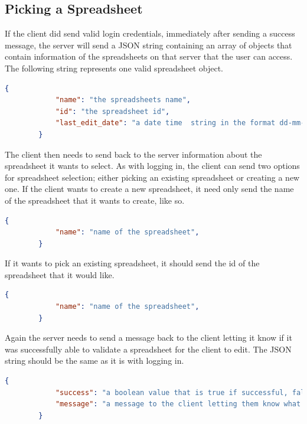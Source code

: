 \documentclass[titlepage]{article}
\begin{document}
    \subsection{Picking a Spreadsheet}
        If the client did send valid login credentials, immediately after sending a success message,
        the server will send a JSON string containing an array of objects that contain information of
        the spreadsheets on that server that the user can access. The following string represents one
        valid spreadsheet object.

        \begin{lstlisting}[language=json,firstnumber=1]
        {
            "name": "the spreadsheets name",
            "id": "the spreadsheet id",
            "last_edit_date": "a date time  string in the format dd-mm-yyyy hh:mm:ss",
        }
        \end{lstlisting}

        The client then needs to send back to the server information about the spreadsheet it wants to select.
        As with logging in, the client can send two options for spreadsheet selection; either picking an existing
        spreadsheet or creating a new one. If the client wants to create a new spreadsheet, it need only send
        the name of the spreadsheet that it wants to create, like so. 
        \begin{lstlisting}[language=json,firstnumber=1]
        {
            "name": "name of the spreadsheet",
        }
        \end{lstlisting}
        If it wants to pick an existing spreadsheet, it should send the id of the spreadsheet that it would like.
        \begin{lstlisting}[language=json,firstnumber=1]
        {
            "name": "name of the spreadsheet",
        }
        \end{lstlisting}

        Again the server needs to send a message back to the client letting it know if it was successfully able to
        validate a spreadsheet for the client to edit. The JSON string should be the same as it is with logging in. 
        \begin{lstlisting}[language=json,firstnumber=1]
        {
            "success": "a boolean value that is true if successful, false if not",
            "message": "a message to the client letting them know what the error was if there was one, or if the user was successfully verified or created"
        }
        \end{lstlisting}
\end{document}
